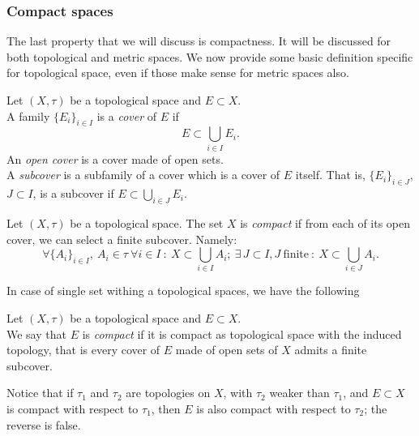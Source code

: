 \subsubsection{Compact spaces}
The last property that we will discuss is compactness. It will be discussed for both topological and metric spaces. We now provide some basic definition specific for topological space, even if those make sense for metric spaces also.

\begin{defn}\label{compact-space-defn}
	Let $(X,\tau)$ be a topological space
	and $E\subset X$.\\
    A family $\{E_i\}_{i\in I}$ is a \emph{cover} of $E$
    if 
    $$
    	E 
    	\subset \bigcup_{i \in I} E_i 
    .
    $$
    An \emph{open cover} is a cover made of open sets.\\
    A \emph{subcover} is a subfamily of a cover which is a cover of $E$ itself.
    That is, $\{E_i\}_{i\in J}$, $J \subset I$,
    is a subcover if $E \subset \bigcup_{i\in J} E_i$.
\end{defn}

\begin{defn}
	Let $(X, \tau)$ be a topological space.
    The set $X$ is \emph{compact}
    if from each of its open cover, we can select a finite subcover. Namely:
    $$
    	\forall \{A_i\}_{i\in I}, 
    	\ A_i \in \tau 
    	\ \forall i \in I 
    	\ : \ X \subset \bigcup_{i\in I} A_i; 
    	\ \exists \, J \subset I, J \ \text{finite}
    	\ : \ X \subset \bigcup_{i \in J} A_i
    .
    $$
\end{defn}

In case of single set withing a topological spaces, we have the following

\begin{defn}
	Let $(X,\tau)$ be a topological space
	and $E\subset X$.\\
	We say that $E$ is \emph{compact} if it is compact as topological space with the induced topology\footnotemark{},
	that is every cover of $E$ made of open sets of $X$ admits a finite subcover.
\end{defn}

Notice that if $\tau_1$ and $\tau_2$ are topologies on $X$, with $\tau_2$ weaker than $\tau_1$, and $E \subset X$ is compact with respect to $\tau_1$, then $E$ is also compact with respect to $\tau_2$; the reverse is false.

